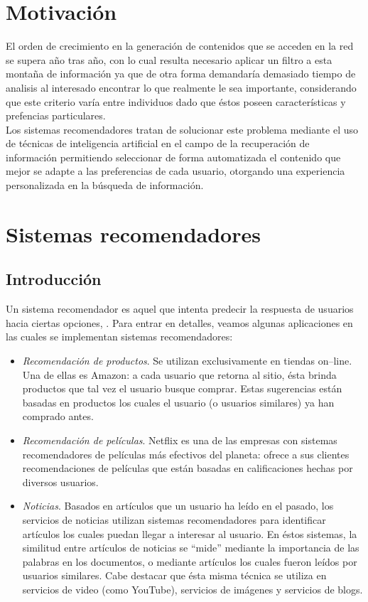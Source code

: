 \section{Motivación}
El orden de crecimiento en la generación de contenidos que se acceden en la red se supera año tras año, con lo cual resulta necesario aplicar un filtro a esta montaña de información ya que de otra forma demandaría demasiado tiempo de analisis al interesado encontrar lo que realmente le sea importante, considerando que este criterio varía entre individuos dado que éstos poseen características y prefencias particulares. \\
Los sistemas recomendadores tratan de solucionar este problema mediante el uso de técnicas de inteligencia artificial en el campo de la recuperación de información permitiendo seleccionar de forma automatizada el contenido que mejor se adapte a las preferencias de cada usuario, otorgando una experiencia personalizada en la búsqueda de información.

\section{Sistemas recomendadores}
	
	\subsection{Introducción}
		Un sistema recomendador es aquel que intenta predecir la respuesta de usuarios hacia ciertas opciones, \cite{ullman2014}. Para entrar en detalles, veamos algunas aplicaciones en las cuales se implementan sistemas recomendadores:
		\begin{itemize}
			\item \textit{Recomendación de productos}. Se utilizan exclusivamente en tiendas on--line. Una de ellas es Amazon: a cada usuario que retorna al sitio, ésta brinda productos que tal vez el usuario busque comprar. Estas sugerencias están basadas en productos los cuales el usuario (o usuarios similares) ya han comprado antes.
			\item \textit{Recomendación de películas}. Netflix es una de las empresas con sistemas recomendadores de películas más efectivos del planeta: ofrece a sus clientes recomendaciones de películas que están basadas en calificaciones hechas por diversos usuarios.
			\item \textit{Noticias}. Basados en artículos que un usuario ha leído en el pasado, los servicios de noticias utilizan sistemas recomendadores para identificar artículos los cuales puedan llegar a interesar al usuario. En éstos sistemas, la similitud entre artículos de noticias se \enquote{mide} mediante la importancia de las palabras en los documentos, o mediante artículos los cuales fueron leídos por usuarios similares. Cabe destacar que ésta misma técnica se utiliza en servicios de video (como YouTube), servicios de imágenes y servicios de blogs.
		\end{itemize}
	
